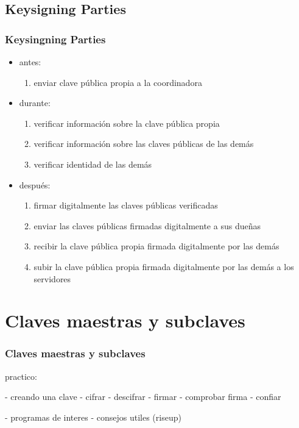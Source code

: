 \documentclass{beamer}
\let\olditem\item
\renewcommand{\item}{%
\olditem\vspace{3pt}}
\begin{document}
\subsection{Keysigning Parties}
\begin{frame}
\frametitle{Keysingning Parties}
\begin{itemize}
    \item antes:
        \begin{enumerate}
            \item enviar clave pública propia a la coordinadora
        \end{enumerate}
    \item durante:
        \begin{enumerate}
            \item verificar información sobre la clave pública propia
            \item verificar información sobre las claves públicas de las demás
            \item verificar identidad de las demás
        \end{enumerate}
    \item después:
        \begin{enumerate}
            \item firmar digitalmente las claves públicas verificadas
            \item enviar las claves públicas firmadas digitalmente a sus dueñas
            \item recibir la clave pública propia firmada digitalmente por las demás
            \item subir la clave pública propia firmada digitalmente por las
                demás a los servidores
        \end{enumerate}
\end{itemize}
\end{frame}


\section{Claves maestras y subclaves}
\begin{frame}
\frametitle{Claves maestras y subclaves}
\end{frame}

\iffalse
practico:

- creando una clave
- cifrar
- descifrar
- firmar
- comprobar firma
- confiar

- programas de interes
- consejos utiles (riseup)
\end{document}
